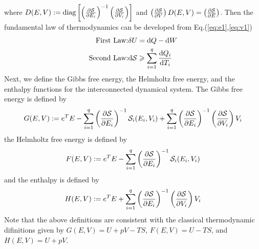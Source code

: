 \documentclass{paper}
\begin{document}
where $D(E,V):=\text{diag}\left[\left(\frac{\partial \mathcal{S}}{\partial E_i}\right)^{-1}\left(\frac{\partial\mathcal{S}}{\partial V_i}\right)\right]$
and $\left(\frac{\partial \mathcal{S}}{\partial V}\right)D(E,V)=\left(\frac{\partial \mathcal{S}}{\partial E}\right)$. Then the fundamental 
law of thermodynamics can be developed from Eq.(\ref{eq:e1},\ref{eq:v1})
\begin{eqnarray}
\text{First Law:}&\delta U=\text{d} Q - \text{d} W \\
\text{Second Law:}&\text{d} \mathcal{S}\geqslant \sum\limits_{i=1}^{q}\frac{\text{d} Q_i}{\text{d} T_i} 
\end{eqnarray}
Next, we define the Gibbs free energy, the Helmholtz free energy, and the enthalpy functions for the interconnected dynamical
system. The Gibbs free energy is defined by
\begin{equation}
G(E,V):=e^TE-\sum\limits_{i=1}^{q}\left(\frac{\partial \mathcal{S}}{\partial E_i}\right)^{-1}\mathcal{S}_i(E_i,V_i)+
\sum\limits_{i=1}^{q}\left(\frac{\partial \mathcal{S}}{\partial E_i}\right)^{-1}\left(\frac{\partial\mathcal{S}}{\partial V_i}\right)V_i
\end{equation}
the Helmholtz free energy is defined by
\begin{equation}
F(E,V):=e^TE-\sum\limits_{i=1}^{q}\left(\frac{\partial \mathcal{S}}{\partial E_i}\right)^{-1}\mathcal{S}_i(E_i,V_i)
\end{equation}
and the enthalpy is defined by
\begin{equation}
H(E,V):=e^TE+\sum\limits_{i=1}^{q}\left(\frac{\partial \mathcal{S}}{\partial E_i}\right)^{-1}\left(\frac{\partial\mathcal{S}}{\partial V_i}\right)V_i
\end{equation}
Note that the above definitions are consistent with the classical thermodynamic difinitions given by $G(E,V)=U+pV-TS$, $F(E,V)=U-TS$,
and $H(E,V)=U+pV$.
\end{document}
